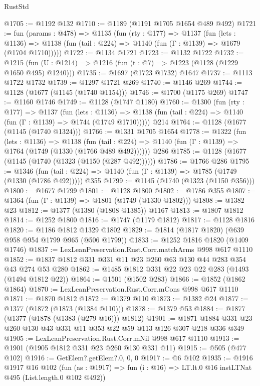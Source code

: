 \begin{lexlean}{RustStd}
\begin{coremodule}
@1705 := @1192 @132
@1710 := @1189 (@1191 @1705 @1654 @489 @492)
@1721 := fun (params : @478) =>
  @1135
    (fun (rty : @177) =>
    @1137
      (fun (lets : @1136) =>
      @1138 (fun (tail : @224) => @1140 (fun (Γ : @1139) => @1679 (@1704 @1710)))))
@1722 := @1134 @1721
@1723 := @1132 @1722
@1732 := @1215 (fun (U : @1214) => @1216 (fun (t : @7) => @1223 (@1128 (@1229 @1650 @495) @1240)))
@1735 := @1697 (@1723 @1732) @1647
@1737 := @1113 @1722 @1732
@1739 := @1297 @1721 @269
@1740 := @1146 @269
@1744 := @1128 (@1677 (@1145 (@1740 @1154)))
@1746 := @1700 (@1175 @269)
@1747 := @1160 @1746
@1749 := @1128 (@1747 @1180)
@1760 := @1300
    (fun (rty : @177) =>
    @1137
      (fun (lets : @1136) =>
      @1138 (fun (tail : @224) => @1140 (fun (Γ : @1139) => @1744 (@1749 @1710)))))
    @214
@1764 := @1128 (@1677 (@1145 (@1740 @1324)))
@1766 := @1331 @1705 @1654
@1778 := @1322
    (fun (lets : @1136) =>
    @1138 (fun (tail : @224) => @1140 (fun (Γ : @1139) => @1764 (@1749 (@1330 (@1766 @489 @492))))))
    @286
@1785 := @1128 (@1677 (@1145 (@1740 (@1323 (@1150 (@287 @492))))))
@1786 := @1766 @286
@1795 := @1346
    (fun (tail : @224) => @1140 (fun (Γ : @1139) => @1785 (@1749 (@1330 (@1786 @492)))))
    @355
@1799 := @1145 (@1740 (@1323 (@1150 @356)))
@1800 := @1677 @1799
@1801 := @1128 @1800
@1802 := @1786 @355
@1807 := @1364 (fun (Γ : @1139) => @1801 (@1749 (@1330 @1802)))
@1808 := @1382 @23
@1812 := @1377 (@1380 (@1808 @1385)) @1167
@1813 := @1807 @1812
@1814 := @1252 @1800
@1816 := @1747 (@1179 @1812)
@1817 := @1128 @1816
@1820 := @1186 @1812 @1329 @1802
@1829 := @1814 (@1817 @1820) (@639 @958 @954 @1799 @965 (@506 @1799))
@1833 := @1252 @1816 @1820 (@1409 @1746)
@1837 := LexLeanPreservation.Rust.Corr.matchArms @998 @617 @1110
@1852 := @1837 @1812 @331 @331 @11 @23 @260 @63 @130 @44 @283 @354 @43 @274 @53 @280
@1862 := @1485 @1812 @331 @22 @23 @22 @283 (@1493 (@1494 @1812 @22))
@1864 := @1501 (@1502 @283)
@1866 := @1852 (@1862 @1864)
@1870 := LexLeanPreservation.Rust.Corr.mCons @998 @617 @1110
@1871 := @1870 @1812
@1872 := @1379 @110
@1873 := @1382 @24
@1877 := @1377 (@1872 (@1873 (@1384 @110)))
@1878 := @1379 @53
@1884 := @1877 (@1377 (@1878 (@1383 (@279 @16))) @1812)
@1901 := @1871 @1884 @331 @23 @260 @130 @43 @331 @11 @353 @22 @59 @113 @126 @307 @218 @336 @349
@1905 := LexLeanPreservation.Rust.Corr.mNil @998 @617 @1110
@1913 := @1901 (@1905 @1812 @331 @23 @260 @130 @331 @11)
@1915 := @505 (@477 @102)
@1916 := GetElem?.getElem?.{0, 0, 0}
@1917 := @6 @102
@1935 := @1916
    @1917
    @16
    @102
    (fun (as : @1917) => fun (i : @16) => LT.lt.{0} @16 instLTNat @495 (List.length.{0} @102 @492))

\end{coremodule}
\end{lexlean}
